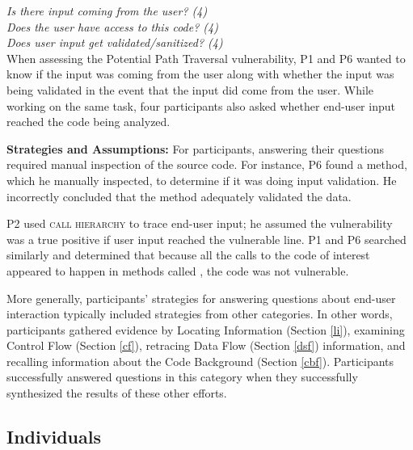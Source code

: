 \documentclass[10pt,journal,compsoc]{IEEEtran}
\begin{document}
\noindent\emph{Is there input coming from the user? (4)} \\
\emph{Does the user have access to this code? (4)} \\
\emph{Does user input get validated/sanitized? (4)} 
\\

 
When assessing the Potential Path Traversal vulnerability, P1 and P6 wanted to know if the input was coming from the user along with whether the input was being validated in the event that the input did come from the user.
While working on the same task, four participants also asked whether end-user input reached the code being analyzed.







\textbf{Strategies and Assumptions:}
For participants, answering their questions required manual inspection of the source code. 
For instance, P6 found a  method, which he manually inspected, to determine if it was doing input validation.
He incorrectly concluded that the  method adequately validated the data.

P2 used \textsc{call hierarchy} to trace end-user input; he assumed the vulnerability was a true positive if user input reached the vulnerable line.
P1 and P6 searched similarly and determined that because all the calls to the code of interest appeared to happen in methods called , the code was not vulnerable.


More generally, participants' strategies for answering questions about end-user interaction typically included strategies from other categories. 
In other words, participants gathered evidence by Locating Information (Section \ref{li}), examining Control Flow (Section \ref{cf}), retracing Data Flow (Section \ref{dsf}) information, and recalling information about the Code Background (Section \ref{cbf}). 
Participants successfully answered questions in this category when they successfully synthesized the results of these other efforts.





\subsection{Individuals}
\end{document}
